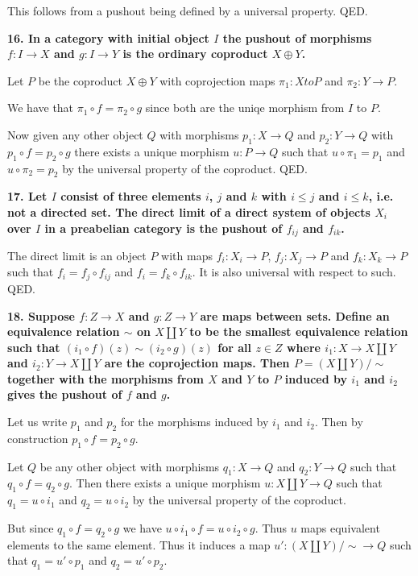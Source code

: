 \documentclass[12pt]{article}
\begin{document}
This follows from a pushout being defined by a universal property. QED.

\textbf{16. In a category with initial object $I$ the pushout of morphisms $f : I \to X$ and $g : I \to Y$ is the ordinary coproduct $X\oplus Y$.}

Let $P$ be the coproduct $X\oplus Y$ with coprojection maps $\pi_1 : X to P$ and $\pi_2 : Y \to P$.

We have that $\pi_1\circ f = \pi_2\circ g$ since both are the uniqe morphism from $I$ to $P$.

Now given any other object $Q$ with morphisms $p_1 : X \to Q$ and $p_2 : Y \to Q$ with $p_1\circ f = p_2\circ g$ there exists a unique morphism $u : P \to Q$ such that $u\circ \pi_1 = p_1$ and $u\circ \pi_2 = p_2$ by the universal property of the coproduct. QED.

\textbf{17. Let $I$ consist of three elements $i$, $j$ and $k$ with $i \leq j$ and $i \leq k$, i.e. not a directed set. The direct limit of a direct system of objects $X_i$ over $I$ in a preabelian category is the pushout of $f_{ij}$ and $f_{ik}$.}

The direct limit is an object $P$ with maps $f_i : X_i \to P$, $f_j : X_j \to P$ and $f_k : X_k \to P$ such that $f_i = f_j\circ f_{ij}$ and $f_i = f_k\circ f_{ik}$. It is also universal with respect to such. QED.

\textbf{18. Suppose $f : Z \to X$ and $g : Z \to Y$ are maps between sets. Define an equivalence relation $\sim$ on $X\coprod Y$ to be the smallest equivalence relation such that $(i_1\circ f)(z) \sim (i_2\circ g)(z)$ for all $z \in Z$ where $i_1 : X \to X\coprod Y$ and $i_2 : Y \to X\coprod Y$ are the coprojection maps. Then $P = (X\coprod Y)/\sim$ together with the morphisms from $X$ and $Y$ to $P$ induced by $i_1$ and $i_2$ gives the pushout of $f$ and $g$.}

Let us write $p_1$ and $p_2$ for the morphisms induced by $i_1$ and $i_2$. Then by construction $p_1\circ f = p_2\circ g$.

Let $Q$ be any other object with morphisms $q_1 : X \to Q$ and $q_2 : Y \to Q$ such that $q_1\circ f = q_2\circ g$. Then there exists a unique morphism $u : X\coprod Y \to Q$ such that $q_1 = u\circ i_1$ and $q_2 = u\circ i_2$ by the universal property of the coproduct.

But since $q_1\circ f = q_2\circ g$ we have $u\circ i_1\circ f = u\circ i_2\circ g$. Thus $u$ maps equivalent elements to the same element. Thus it induces a map $u' : (X\coprod Y)/\sim \to Q$ such that $q_1 = u'\circ p_1$ and $q_2 = u'\circ p_2$.
\end{document}
